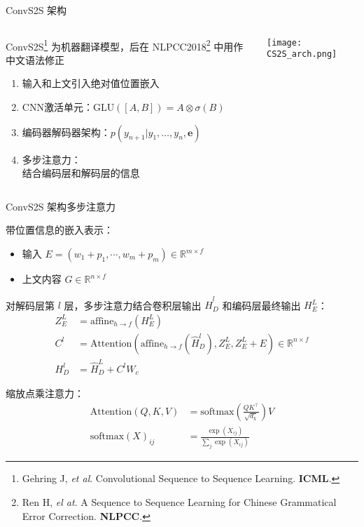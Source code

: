 \begin{frame}[c]{ConvS2S 架构}
	\begin{columns}[t]
		\begin{column}[T]{5cm}
			{\footnotesize ConvS2S\footnote{Gehring J, \textit{et al}. Convolutional Sequence to Sequence Learning. \textbf{ICML}.} 为机器翻译模型，后在 NLPCC2018\footnote{{\fontsize{7}{7} \selectfont Ren H, \textit{el at}. A Sequence to Sequence Learning for Chinese Gram­matical Error Correction. \textbf{NLPCC}.}} 中用作中文语法修正}
			\begin{enumerate}
				\item {\footnotesize 输入和上文引入绝对值位置嵌入}
				\item {\footnotesize CNN激活单元：$\text{GLU}([A, B]) = A \otimes \sigma(B)$}
				\item {\footnotesize 编码器解码器架构：$p(y_{n+1}|y_1,\dots,y_n,\textbf{e})$}
				\item {\footnotesize 多步注意力：\\ 结合编码层和解码层的信息}
			\end{enumerate}
		\end{column}
		\begin{column}[T]{6cm}
			\vspace{-2.5em}
			\texttt{[image: CS2S\_arch.png]}
		\end{column}
	\end{columns}
\end{frame}

\begin{frame}[c]{ConvS2S 架构}{多步注意力}
{\footnotesize
	带位置信息的嵌入表示：
	\begin{itemize}
		\item 输入 $E = (w_1 + p_1, \cdots, w_m + p_m) \in \mathbb{R}^{m \times f}$
		\item 上文内容 $G \in \mathbb{R}^{n \times f}$
	\end{itemize}

	对解码层第 $l$ 层，多步注意力结合卷积层输出 $\hat{H}_D^l$ 和编码层最终输出 $H^L_E$：
	\begin{align}
		Z_E^L &= \text{affine}_{h \rightarrow f}(H_E^L) \\
		C^l &= \text{Attention}(\text{affine}_{h \rightarrow f}(\hat{H}_D^l), Z_E^L, Z_E^L + E) \in \mathbb{R}^{n \times f}\\
		H_D^l &= \hat{H}^L_D + C^l W_c
	\end{align}
	
	缩放点乘注意力：
	\begin{align}
		\text{Attention} (Q, K, V) &= \text{softmax}(\frac{QK^\top}{\sqrt{d_k}}) V \\
		\text{softmax}(X)_{ij} &= \frac{\exp(X_{ij})}{\sum_j \exp(X_{ij})}
	\end{align}
}%
\end{frame}

